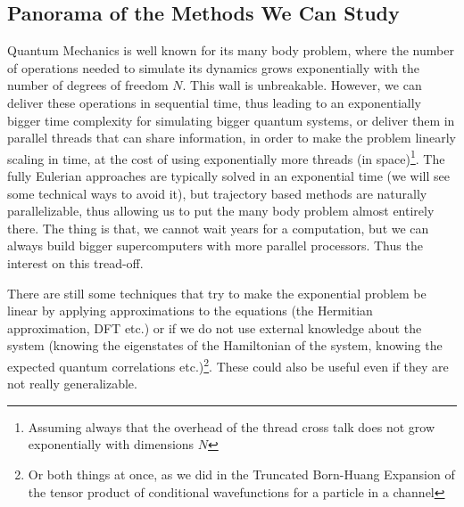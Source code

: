 \documentclass[11pt, a4paper]{article} %
\begin{document}
\subsection*{ Panorama of the Methods We Can Study }

Quantum Mechanics is well known for its many body problem, where the number of operations needed to simulate its dynamics grows exponentially with the number of degrees of freedom $N$. This wall is unbreakable. However, we can deliver these operations in sequential time, thus leading to an exponentially bigger time complexity for simulating bigger quantum systems, or deliver them in parallel threads that can share information, in order to make the problem linearly scaling in time, at the cost of using exponentially more threads (in space)\footnote{Assuming always that the overhead of the thread cross talk does not grow exponentially with dimensions $N$}. The fully Eulerian approaches are typically solved in an exponential time (we will see some technical ways to avoid it), but trajectory based methods are naturally parallelizable, thus allowing us to put the many body problem almost entirely there. The thing is that, we cannot wait years for a computation, but we can always build bigger supercomputers with more parallel processors. Thus the interest on this tread-off.

There are still some techniques that try to make the exponential problem be linear by applying approximations to the equations (the Hermitian approximation, DFT etc.) or if we do not use external knowledge about the system (knowing the eigenstates of the Hamiltonian of the system, knowing the expected quantum correlations etc.)\footnote{Or both things at once, as we did in the Truncated Born-Huang Expansion of the tensor product of conditional wavefunctions for a particle in a channel}. These could also be useful even if they are not really generalizable.
\end{document}
